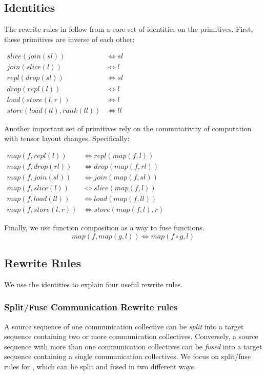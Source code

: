 \subsection{Identities}
The rewrite rules in \tool follow from a core set of identities on the primitives. First, these primitives are inverse of each other:
\begin{center}
  $
\begin{array}{ll}
  slice(join(sl)) &\iff sl\\
  join(slice(l)) &\iff l\\
  repl(drop(sl)) &\iff sl\\
  drop(repl(l))  &\iff l\\
  load(store(l,r)) & \iff l\\
  store(load(ll), rank(ll)) & \iff ll
\end{array}
$
\end{center}
Another important set of primitives rely on the commutativity of computation with tensor layout changes. Specifically:
\begin{center}
  $
\begin{array}{ll}
  map(f, repl(l)) &\iff repl(map(f, l))\\
  map(f, drop(rl)) &\iff drop(map(f, rl))\\
  map(f, join(sl)) &\iff join(map(f, sl))\\
  map(f, slice(l)) &\iff slice(map(f, l))\\
  map(f, load(ll)) &\iff load(map(f, ll))\\
  map(f, store(l, r)) &\iff store(map(f, l), r)
\end{array}
$
\end{center}
Finally, we use function composition as a way to fuse functions.
$$ map(f, map(g, l)) \iff map(f \circ g, l)$$

\subsection{Rewrite Rules}
We use the identities to 
explain four useful rewrite rules.

\subsubsection{Split/Fuse Communication Rewrite rules} 
A source sequence of one communication collective can be \emph{split} into a target sequence containing two or more communication collectives. 
Conversely, a source sequence with more than one communication collectives can be \emph{fused} into a target sequence containing a single communication collectives.
We focus on split/fuse rules for \allreduce, which can be split and fused in two different ways.

